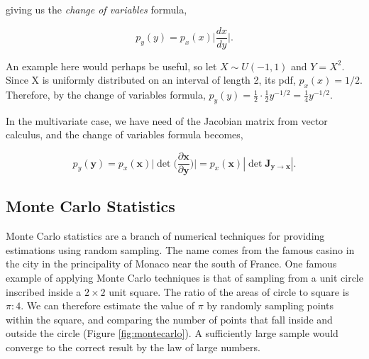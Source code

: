 \documentclass[11pt]{amsart}
\begin{document}
giving us the \emph{change of variables} formula,

$$p_y(y) = p_x(x)\Big|\frac{dx}{dy}\Big|.$$

An example here would perhaps be useful, so let $X \sim U(-1, 1)$ and $Y = X^2$. Since X is uniformly distributed on an interval of length 2, its pdf, $p_x(x) = 1/2$. Therefore, by the change of variables formula, $p_y(y) = \frac{1}{2} \cdot \frac{1}{2}y^{-1/2} = \frac{1}{4}y^{-1/2}$.

In the multivariate case, we have need of the Jacobian matrix from vector calculus, and the change of variables formula becomes,

%
%

$$p_y(\mathbf{y}) = p_x(\mathbf{x})\big|\det \Bigg(\frac{\partial\mathbf{x}}{\partial\mathbf{y}}\Bigg)\big| = p_x(\mathbf{x})|\det \mathbf{J}_{\mathbf{y} \to \mathbf{x}}|.$$

\subsection{Monte Carlo Statistics}

Monte Carlo statistics are a branch of numerical techniques for providing estimations using random sampling. The name comes from the famous casino in the city in the principality of Monaco near the south of France. One famous example of applying Monte Carlo techniques is that of sampling from a unit circle inscribed inside a $2 \times 2$ unit square. The ratio of the areas of circle to square is $\pi : 4$. We can therefore estimate the value of $\pi$ by randomly sampling points within the square, and comparing the number of points that fall inside and outside the circle (Figure \ref{fig:montecarlo}). A sufficiently large sample would converge to the correct result by the law of large numbers.
\end{document}
